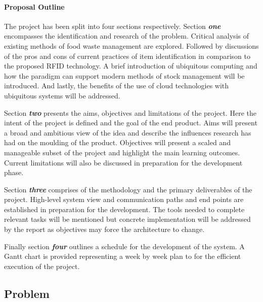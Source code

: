 \documentclass[a4paper, 11pt]{article}
\begin{document}
\vspace{\baselineskip}

\paragraph{Proposal Outline}
The project has been split into four sections respectively. Section \textbf{\emph{one}} encompasses the identification and research of the problem. Critical analysis of existing methods of food waste management are explored. Followed by discussions of the pros and cons of current practices of item identification in comparison to the proposed RFID technology. A brief introduction of ubiquitous computing and how the paradigm can support modern methods of stock management will be introduced. And lastly, the benefits of the use of cloud technologies with ubiquitous systems will be addressed.  

\vspace{\baselineskip}
Section \textbf{\emph{two}} presents the aims, objectives and limitations of the project. Here the intent of the project is defined and the goal of the end product. Aims will present a broad and ambitious view of the idea and describe the influences research has had on the moulding of the product. Objectives will present a scaled and manageable subset of the project and highlight the main learning outcomes. Current limitations will also be discussed in preparation for the development phase.

\vspace{\baselineskip}
Section \textbf{\emph{three}} comprises of the methodology and the primary deliverables of the project. High-level system view and communication paths and end points are established in preparation for the development. The tools needed to complete relevant tasks will be mentioned but concrete implementation will be addressed by the report as objectives may force the architecture to change. 
\vspace{\baselineskip}

Finally section \textbf{\emph{four}} outlines a schedule for the development of the system. A Gantt chart is provided representing a week by week plan to for the efficient execution of the project.

\vspace{\baselineskip}
\vspace{\baselineskip}
\vspace{\baselineskip}


\subsection{Problem}
\end{document}
